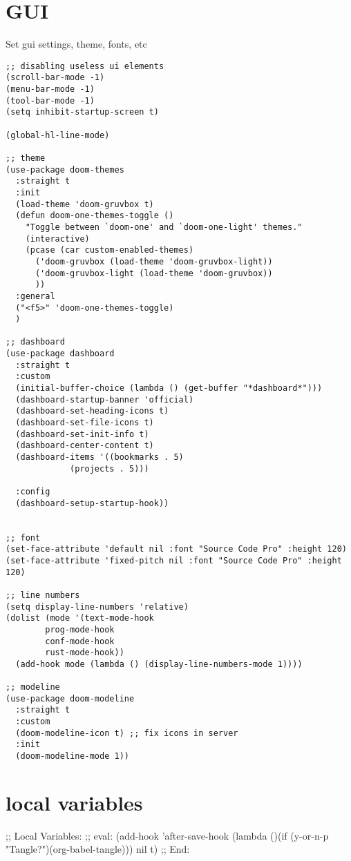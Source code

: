 \documentclass[11pt]{article}
\begin{document}
\section{GUI}
\label{sec:orge2d7d2c}
Set gui settings, theme, fonts, etc
\begin{verbatim}
;; disabling useless ui elements
(scroll-bar-mode -1)
(menu-bar-mode -1)
(tool-bar-mode -1)
(setq inhibit-startup-screen t)

(global-hl-line-mode)

;; theme
(use-package doom-themes
  :straight t
  :init
  (load-theme 'doom-gruvbox t)
  (defun doom-one-themes-toggle ()
    "Toggle between `doom-one' and `doom-one-light' themes."
    (interactive)
    (pcase (car custom-enabled-themes)
      ('doom-gruvbox (load-theme 'doom-gruvbox-light))
      ('doom-gruvbox-light (load-theme 'doom-gruvbox))
      ))
  :general
  ("<f5>" 'doom-one-themes-toggle)
  )

;; dashboard
(use-package dashboard
  :straight t
  :custom
  (initial-buffer-choice (lambda () (get-buffer "*dashboard*")))
  (dashboard-startup-banner 'official)
  (dashboard-set-heading-icons t)
  (dashboard-set-file-icons t)
  (dashboard-set-init-info t)
  (dashboard-center-content t)
  (dashboard-items '((bookmarks . 5)
		     (projects . 5)))

  :config
  (dashboard-setup-startup-hook))


;; font
(set-face-attribute 'default nil :font "Source Code Pro" :height 120)
(set-face-attribute 'fixed-pitch nil :font "Source Code Pro" :height 120)

;; line numbers
(setq display-line-numbers 'relative)
(dolist (mode '(text-mode-hook
		prog-mode-hook
		conf-mode-hook
		rust-mode-hook))
  (add-hook mode (lambda () (display-line-numbers-mode 1))))

;; modeline
(use-package doom-modeline
  :straight t
  :custom
  (doom-modeline-icon t) ;; fix icons in server
  :init
  (doom-modeline-mode 1))

\end{verbatim}
\section{local variables}
\label{sec:orgf99eecf}
;; Local Variables: 
;; eval: (add-hook 'after-save-hook (lambda ()(if (y-or-n-p "Tangle?")(org-babel-tangle))) nil t) 
;; End:
\end{document}
